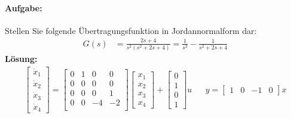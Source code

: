 \paragraph{Aufgabe:}
Stellen Sie folgende Übertragungsfunktion in Jordannormalform dar:
\begin{align*}
    G(s) &=  \frac{2s+4}{s^2(s^2+2s+4)} = \frac{1}{s^2} - \frac{1}{s^2+2s+4}
\end{align*}
\textbf{Lösung:}
\begin{align*}
    \begin{bmatrix}
    \dot{x}_1\\\dot{x}_2\\\dot{x}_3\\\dot{x}_4
        \end{bmatrix} = \left[\begin{array}{cc|cc}
        0&1&0&0\\
        0&0&0&0\\\hline
        0&0&0&1\\
        0&0&-4&-2\\
        \end{array}\right]\begin{bmatrix}
        x_1\\x_2\\x_3\\x_4
        \end{bmatrix} + \begin{bmatrix}
            0\\1\\0\\1
        \end{bmatrix}u && y = \begin{bmatrix}
        1 &0&-1&0
        \end{bmatrix}x
\end{align*}
